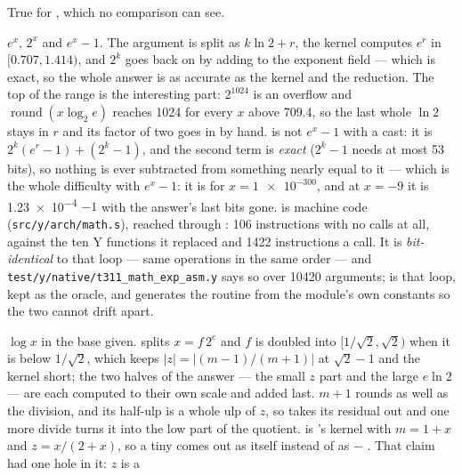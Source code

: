 \begin{description}[style=nextline,leftmargin=5.2em]
\item[\ic{math.is\_signed\_zero(x)}] True for , which no comparison
  can see.
  \item[\ic{math.exp(x)}, \ic{math.exp2(x)}, \ic{math.expm1(x)}] $e^x$, $2^x$
    and $e^x-1$. The argument is split as $k\ln 2 + r$, the kernel computes
    $e^r$ in $[0.707, 1.414)$, and $2^k$ goes back on by adding to the exponent
    field --- which is exact, so the whole answer is as accurate as the kernel and
    the reduction. The top of the range is the interesting part: $2^{1024}$ is an
    overflow and $\operatorname{round}(x\log_2 e)$ reaches \num{1024} for every $x$ above
    \num{709.4}, so the last whole $\ln 2$ stays in $r$ and its factor of two
    goes in by hand.  is not $e^x - 1$ with a cast: it is
    $2^k\!\left(e^r-1\right) + \left(2^k-1\right)$, and the second term is
    \emph{exact} ($2^k-1$ needs at most 53 bits), so nothing is ever subtracted
    from something nearly equal to it --- which is the whole difficulty with
    $e^x-1$: it is  for $x = \num{1e-300}$, and at $x = -9$ it is
    \num{1.23e-4} $- 1$ with the answer's last bits gone.
     is machine code (\texttt{src/y/arch/math.s}), reached through
    : \num{106} instructions with no calls at
    all, against the ten Y functions it replaced and \num{1422} instructions a
    call. It is \emph{bit-identical} to that loop --- same operations in the same
    order --- and \texttt{test/y/native/t311\_math\_exp\_asm.y} says so over
    \num{10420} arguments;  is that loop, kept as the oracle, and
     generates the routine from the module's own
    constants so the two cannot drift apart.
  \item[\ic{math.log(x)}, \ic{math.log2(x)}, \ic{math.log10(x)},
    \ic{math.log1p(x)}] $\log x$ in the base given.  splits
    $x = f\,2^e$ and $f$ is doubled into $[1/\sqrt{2}, \sqrt{2})$ when it is
    below $1/\sqrt{2}$, which keeps $|z| = |(m-1)/(m+1)|$ at $\sqrt{2}-1$ and the
    kernel short; the two halves of the answer --- the small $z$ part and the
    large $e\ln 2$ --- are each computed to their own scale and added last.
    $m+1$ rounds as well as the division, and its half-ulp is a whole ulp of $z$,
    so  takes its residual out and one more divide turns it into the
    low part of the quotient.  is 's kernel with $m = 1+x$ and
    $z = x/(2+x)$, so a tiny  comes out as itself instead of as
     $-$ . That claim had one hole in it: $z$ is a

\end{description}

